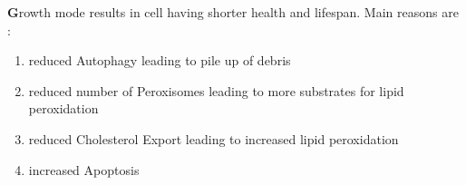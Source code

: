 \textbf Growth mode results in cell having shorter health and lifespan. Main reasons are :
\begin{enumerate}
\item reduced Autophagy leading to pile up of debris
\item reduced number of Peroxisomes leading to more substrates for lipid peroxidation
\item reduced Cholesterol Export leading to increased lipid peroxidation
\item increased Apoptosis
\end{enumerate}